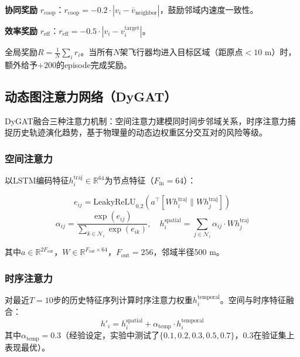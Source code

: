 \documentclass[12pt,a4paper,UTF8]{ctexart}
\begin{document}
\textbf{协同奖励} $r_{\text{coop}}$：$r_{\text{coop}} = -0.2 \cdot |v_i - \bar{v}_{\text{neighbor}}|$，鼓励邻域内速度一致性。

\textbf{效率奖励} $r_{\text{eff}}$：$r_{\text{eff}} = -0.5 \cdot |v_i - v_i^{\text{target}}|$。

全局奖励$R = \frac{1}{N}\sum_i r_i$。当所有$N$架飞行器均进入目标区域（距原点$<10$ m）时，额外给予$+200$的episode完成奖励。

\subsection{动态图注意力网络（DyGAT）}

DyGAT融合三种注意力机制：空间注意力建模同时间步邻域关系，时序注意力捕捉历史轨迹演化趋势，基于物理量的动态边权重区分交互对的风险等级。

\subsubsection{空间注意力}

以LSTM编码特征$h_i^{\text{traj}} \in \mathbb{R}^{64}$为节点特征（$F_{\text{in}}=64$）：

\begin{equation}
    e_{ij} = \text{LeakyReLU}_{0.2}\left(a^{\top}[W h_i^{\text{traj}} \parallel W h_j^{\text{traj}}]\right)
\end{equation}
\begin{equation}
    \alpha_{ij} = \frac{\exp(e_{ij})}{\sum_{k \in \mathcal{N}_i} \exp(e_{ik})},\quad
    h_i^{\text{spatial}} = \sum_{j \in \mathcal{N}_i} \alpha_{ij} \cdot W h_j^{\text{traj}}
\end{equation}

其中$a \in \mathbb{R}^{2F_{\text{out}}}$，$W \in \mathbb{R}^{F_{\text{out}} \times 64}$，$F_{\text{out}}=256$，邻域半径500 m。

\subsubsection{时序注意力}

对最近$T=10$步的历史特征序列计算时序注意力权重$h_i^{\text{temporal}}$。空间与时序特征融合：
\begin{equation}
    h'_i = h_i^{\text{spatial}} + \alpha_{\text{temp}} \cdot h_i^{\text{temporal}}
\end{equation}
其中$\alpha_{\text{temp}} = 0.3$（经验设定，实验中测试了$\{0.1,0.2,0.3,0.5,0.7\}$，0.3在验证集上表现最优）。
\end{document}

